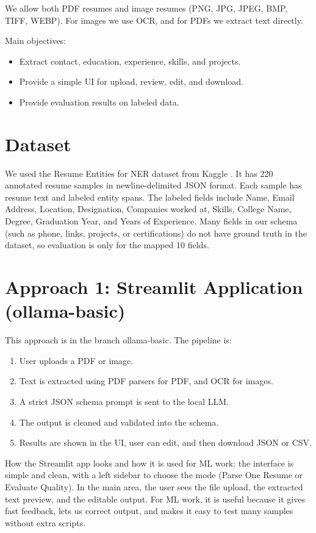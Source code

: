 \documentclass[11pt,a4paper]{article}
\begin{document}
We allow both PDF resumes and image resumes (PNG, JPG, JPEG, BMP, TIFF, WEBP). For images we use OCR, and for PDFs we extract text directly.

Main objectives:
\begin{itemize}
\item Extract contact, education, experience, skills, and projects.
\item Provide a simple UI for upload, review, edit, and download.
\item Provide evaluation results on labeled data.
\end{itemize}

\section{Dataset}
We used the Resume Entities for NER dataset from Kaggle \cite{dataset}. It has 220 annotated resume samples in newline-delimited JSON format. Each sample has resume text and labeled entity spans. The labeled fields include Name, Email Address, Location, Designation, Companies worked at, Skills, College Name, Degree, Graduation Year, and Years of Experience. Many fields in our schema (such as phone, links, projects, or certifications) do not have ground truth in the dataset, so evaluation is only for the mapped 10 fields.

\section{Approach 1: Streamlit Application (ollama-basic)}
This approach is in the branch ollama-basic. The pipeline is:
\begin{enumerate}
\item User uploads a PDF or image.
\item Text is extracted using PDF parsers for PDF, and OCR for images.
\item A strict JSON schema prompt is sent to the local LLM.
\item The output is cleaned and validated into the schema.
\item Results are shown in the UI, user can edit, and then download JSON or CSV.
\end{enumerate}

How the Streamlit app looks and how it is used for ML work: the interface is simple and clean, with a left sidebar to choose the mode (Parse One Resume or Evaluate Quality). In the main area, the user sees the file upload, the extracted text preview, and the editable output. For ML work, it is useful because it gives fast feedback, lets us correct output, and makes it easy to test many samples without extra scripts.
\end{document}
